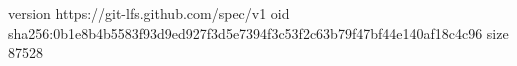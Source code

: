 version https://git-lfs.github.com/spec/v1
oid sha256:0b1e8b4b5583f93d9ed927f3d5e7394f3c53f2c63b79f47bf44e140af18c4c96
size 87528
